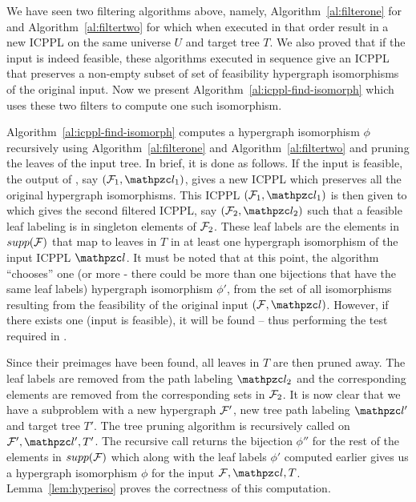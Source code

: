 We have seen two filtering algorithms above, namely,
Algorithm~\ref{al:filterone} for \filteri and
Algorithm~\ref{al:filtertwo} for \filterii which when executed
in that order result in a new ICPPL on the same universe $U$ and
target tree $T$. We also proved that if the input is indeed feasible,
these algorithms executed in sequence give an ICPPL that preserves a
non-empty subset of set of feasibility hypergraph isomorphisms of the
original input. %
Now we present Algorithm~\ref{al:icppl-find-isomorph} which uses these
two filters to compute one such isomorphism.



Algorithm~\ref{al:icppl-find-isomorph} computes a hypergraph
isomorphism $\phi$ recursively using Algorithm~\ref{al:filterone} and
Algorithm~\ref{al:filtertwo} and pruning the leaves of the input
tree. In brief, it is done as follows. If the input is feasible, the
output of \filteri, say $(\cF_1, \cl_1)$, gives a new ICPPL
which preserves all the original hypergraph isomorphisms.  This ICPPL
$(\cF_1, \cl_1)$ is then given to \filterii which gives the
second filtered ICPPL, say $(\cF_2, \cl_2)$ such that a feasible leaf
labeling is in singleton elements of ${\cal F}_2$. These leaf labels are
the elements in $supp({\cal F})$ that map to leaves in $T$ in at least one
hypergraph isomorphism of the input ICPPL $\cl$. It must be noted that
at this point, the algorithm ``chooses'' one (or more - there could be
more than one bijections that have the same leaf labels) hypergraph
isomorphism $\phi'$, from the set of all isomorphisms resulting from the
feasibility of the original input $(\cF, \cl)$. However, if there
exists one (\ie input is feasible), it will be found -- thus
performing the test required in \FTPL.

Since their preimages have been found, all leaves in $T$ are then
pruned away. The leaf labels are removed from the path labeling
$\cl_2$ and the corresponding elements are removed from the
corresponding sets in ${\cal F}_2$. It is now clear that we have a
subproblem with a new hypergraph ${\cal F}'$, new tree path labeling $\cl'$
and target tree $T'$.  The tree pruning algorithm is recursively
called on $\cF', \cl', T'$. The recursive call returns the bijection
$\phi''$ for the rest of the elements in $supp({\cal F})$ which along with
the leaf labels $\phi'$ computed earlier gives us a hypergraph
isomorphism $\phi$ for the input $\cF,\cl,T$.  
Lemma~\ref{lem:hyperiso} proves the correctness of this computation.

